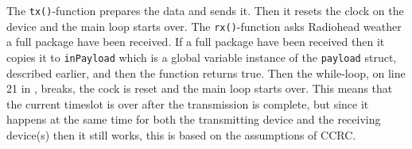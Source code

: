 The \texttt{tx()}-function prepares the data and sends it.
Then it resets the clock on the device and the main loop starts over.
The \texttt{rx()}-function asks Radiohead weather a full package have been received. 
If a full package have been received then it copies it to \texttt{inPayload} which is a global variable instance of the \texttt{payload} struct, described earlier, and then the function returns true.
Then the while-loop, on line 21 in , breaks, the cock is reset and the main loop starts over. 
This means that the current timeslot is over after the transmission is complete, but since it happens at the same time for both the transmitting device and the receiving device(s) then it still works, this is based on the assumptions of CCRC. 